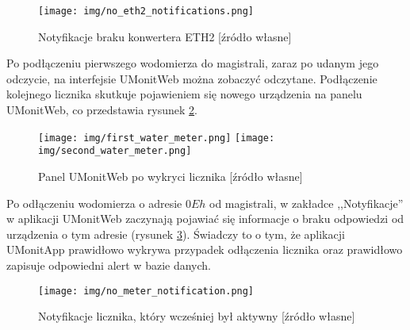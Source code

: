 \begin{figure}[ht]
	\centering
	\texttt{[image: img/no\_eth2\_notifications.png]}
	\caption[Notyfikacje braku konwertera ETH2]{Notyfikacje braku konwertera ETH2 [źródło własne]}
	\label{fig:no_eth2_notifications}
\end{figure}

Po podłączeniu pierwszego wodomierza do magistrali, zaraz po udanym jego odczycie, na interfejsie UMonitWeb można zobaczyć odczytane.
Podłączenie kolejnego licznika skutkuje pojawieniem się nowego urządzenia na panelu UMonitWeb, co przedstawia rysunek \ref{fig:first_water_meter}.

\begin{figure}[ht]
	\centering
	\texttt{[image: img/first\_water\_meter.png]}
	\texttt{[image: img/second\_water\_meter.png]}
	\caption[Panel UMonitWeb po wykryci licznika]{Panel UMonitWeb po wykryci licznika [źródło własne]}
	\label{fig:first_water_meter}
\end{figure}

Po odłączeniu wodomierza o adresie $ 0Eh $ od magistrali, w zakładce ,,Notyfikacje'' w aplikacji UMonitWeb zaczynają pojawiać się informacje o braku odpowiedzi od urządzenia o tym adresie (rysunek \ref{fig:no_meter_notification}).
Świadczy to o tym, że aplikacji UMonitApp prawidłowo wykrywa przypadek odłączenia licznika oraz prawidłowo zapisuje odpowiedni alert w bazie danych.

\begin{figure}[ht]
	\centering
	\texttt{[image: img/no\_meter\_notification.png]}
	\caption[Notyfikacje o braku licznika, który wcześniej był aktywny]{Notyfikacje licznika, który wcześniej był aktywny [źródło własne]}
	\label{fig:no_meter_notification}
\end{figure}

